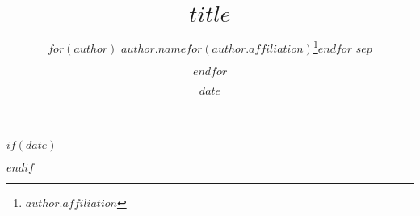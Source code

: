 %

\title{$title$}
\author{%
    $for(author)$
    $author.name$$for(author.affiliation)$\thanks{$author.affiliation$}$endfor$
    $sep$ \and
    $endfor$
}

$if(date)$
\date{$date$}
$endif$

\newcommand{\makeabstract}{
\begin{abstract}
$if(abstract)$
    $abstract$
$else$
    Please write an abstract in the \texttt{paper-meta.yaml} file.
$endif$
\end{abstract}
}
